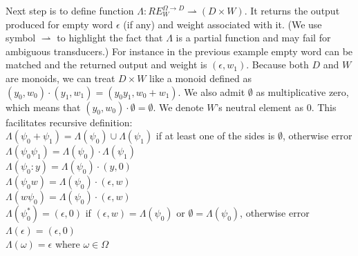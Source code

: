 Next step is to define function $\Lambda:RE_W^{\Omega\rightarrow D} \rightharpoonup ( D \times W)$. It returns the output produced for empty word $\epsilon$ (if any) and weight associated with it. (We use symbol $\rightharpoonup$ to highlight the fact that $\Lambda$ is a partial function and may fail for ambiguous transducers.) For instance in the previous example empty word can be matched and the returned output and weight is $(\epsilon,w_1)$. Because both $D$ and $W$ are monoids, we can treat $D \times W$ like a monoid defined as $(y_0,w_0)\cdot(y_1,w_1) = (y_0y_1,w_0+w_1)$. We also admit $\emptyset$ as multiplicative zero, which means that $(y_0,w_0)\cdot\emptyset=\emptyset$. We denote  $W$'s neutral element as $0$. This facilitates recursive definition: \\
$\Lambda(\psi_0+\psi_1) = \Lambda(\psi_0) \cup \Lambda(\psi_1)$ if at least one of the sides is $\emptyset$, otherwise error\\
$\Lambda(\psi_0\psi_1) =\Lambda(\psi_0) \cdot \Lambda(\psi_1)$ \\
$\Lambda(\psi_0 : y) = \Lambda(\psi_0) \cdot (y,0)$ \\
$\Lambda(\psi_0 w) = \Lambda(\psi_0) \cdot (\epsilon,w)$\\
$\Lambda(w \psi_0 ) =  \Lambda(\psi_0) \cdot (\epsilon,w)$ \\
$\Lambda(\psi_0^* ) = (\epsilon,0)$ if $(\epsilon,w) = \Lambda(\psi_0) $ or $\emptyset = \Lambda(\psi_0) $, otherwise error \\
$\Lambda(\epsilon) = (\epsilon,0)$\\
$\Lambda(\omega) = \epsilon$ where $\omega\in\Omega$

